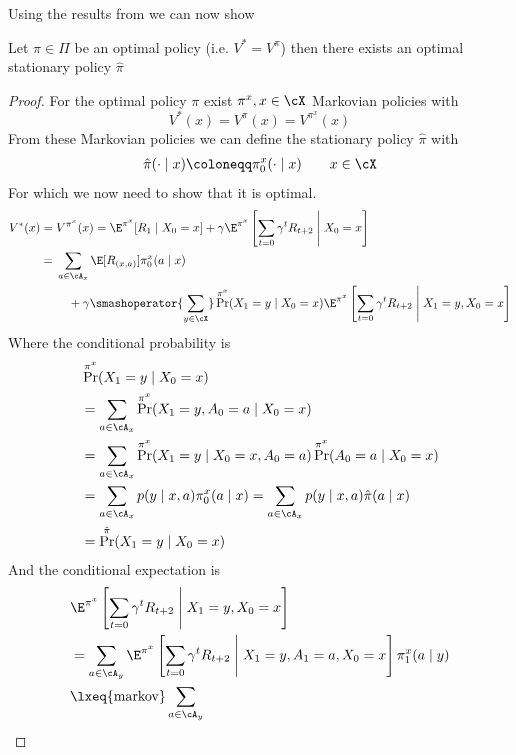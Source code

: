 Using the results from \citeauthor{putermanMarkovDecisionProcesses2005} we can now show
\begin{thm}\label{optimal policy => opt stat policy}
	Let \(\pi\in\Pi\) be an optimal policy (i.e. \(V^*=V^\pi\)) then there exists an optimal stationary policy \(\hat{\pi}\)
\end{thm}
\begin{proof}
	For the optimal policy \(\pi\) exist \(\pi^x,x\in\cX\) Markovian policies with
	\[
		V^*(x)=V^\pi(x)=V^{\pi^x}(x)
	\]
	From these Markovian policies we can define the stationary policy \(\hat{\pi}\) with
	\begin{align}
		\hat{\pi}(\cdot\mid x)\coloneqq \pi_0^x(\cdot\mid x) \qquad x\in\cX
	\end{align}
	For which we now need to show that it is optimal.
	\begin{align}
		V^*(x)&=V^{\pi^x}(x)=\E^{\pi^x}[R_1\mid X_0=x] 
		+ \gamma \E^{\pi^x}\left[\sum_{t=0}\gamma^t R_{t+2}\;\middle|\; X_0=x \right] \nonumber\\
		&=\begin{aligned}[t]
			&\sum_{a\in\cA_x}\E[R_{(x,a)}]\pi_0^x(a\mid x)\\
			&\quad + \gamma \smashoperator{\sum_{y\in\cX}}\Pr^{\pi^x}(X_1=y\mid X_0=x)
			\E^{\pi^x}\left[\sum_{t=0}\gamma^t R_{t+2}\;\middle|\; X_1=y, X_0=x\right]\label{V^pi^x expanded}
		\end{aligned}
	\end{align}
	Where the conditional probability is
	\begin{align}
		&\Pr^{\pi^x}(X_1=y\mid X_0=x) \nonumber \\
		&=\sum_{a\in\cA_x} \Pr^{\pi^x}(X_1=y, A_0=a \mid X_0=x) \nonumber\\
		&=\sum_{a\in\cA_x} \Pr^{\pi^x}(X_1=y\mid X_0=x, A_0=a) \Pr^{\pi^x}(A_0=a\mid X_0=x)\nonumber\\
		&=\sum_{a\in\cA_x} p(y\mid x,a) \pi^x_0(a\mid x)
		=\sum_{a\in\cA_x} p(y\mid x,a) \hat{\pi}(a\mid x) \nonumber\\
		&=\Pr^{\hat{\pi}}(X_1=y\mid X_0=x)
	\end{align}
	And the conditional expectation is
	\begin{align}
		&\E^{\pi^x}\left[\sum_{t=0}\gamma^t R_{t+2}\;\middle|\; X_1=y, X_0=x\right]\nonumber\\
		&=\sum_{a\in\cA_y}
		\E^{\pi^x}\left[\sum_{t=0}\gamma^t R_{t+2}\;\middle|\; X_1=y, A_1=a, X_0=x\right]\pi^x_1(a\mid y)\nonumber\\
		&\lxeq{\text{markov}} \sum_{a\in\cA_y}

\end{align}
\end{proof}
